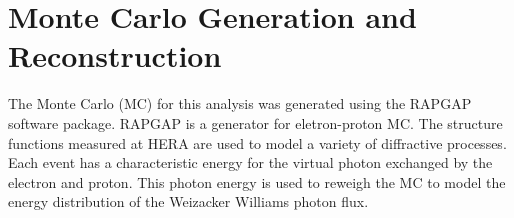 
\chapter{Monte Carlo Generation and Reconstruction}

The Monte Carlo (MC) for this analysis was generated using the RAPGAP software package. RAPGAP is a generator for eletron-proton MC. The structure functions measured at HERA are used to model a variety of diffractive processes. Each event has a characteristic energy for the virtual photon exchanged by the electron and proton. This photon energy is used to reweigh the MC to model the energy distribution of the Weizacker Williams photon flux. 